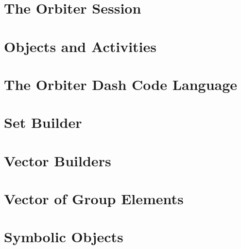 

\section{The Orbiter Session}
\label{sec:session}





\clearpage


\section{Objects and Activities}
\label{sec:objects:activities}





\clearpage




\section{The Orbiter Dash Code Language}
\label{sec:orbiter:dash:code}





\clearpage






%





\section{Set Builder}
\label{sec:set:builder}





\clearpage





\section{Vector Builders}
\label{sec:vector:builder}





\clearpage

\section{Vector of Group Elements}
\label{sec:vector:ge:builder}





\clearpage

\section{Symbolic Objects}
\label{sec:symbolic:objects}





\clearpage


